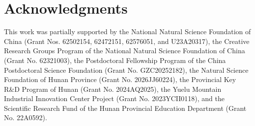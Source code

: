 \section*{Acknowledgments}
This work was partially supported by the National Natural Science Foundation of China (Grant Nos. 62502154, 62472151, 62576051, and U23A20317), the Creative Research Groups Program of the National Natural Science Foundation of China (Grant No. 62321003), the Postdoctoral Fellowship Program of the China Postdoctoral Science Foundation (Grant No. GZC20252182), the Natural Science Foundation of Hunan Province (Grant No. 2026JJ60224), the Provincial Key R\&D Program of Hunan (Grant No. 2024AQ2025), the Yuelu Mountain Industrial Innovation Center Project (Grant No. 2023YCII0118), and the Scientific Research Fund of the Hunan Provincial Education Department (Grant No. 22A0592).
